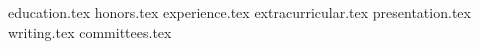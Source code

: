 \documentclass[11pt, a4paper]{awesome-cv}
\newcommand*{\sectiondir}{resume/}
\begin{document}
\makecvheader

{education.tex}
{honors.tex}
{experience.tex}
{extracurricular.tex}
{presentation.tex}
{writing.tex}
{committees.tex}
\end{document}
